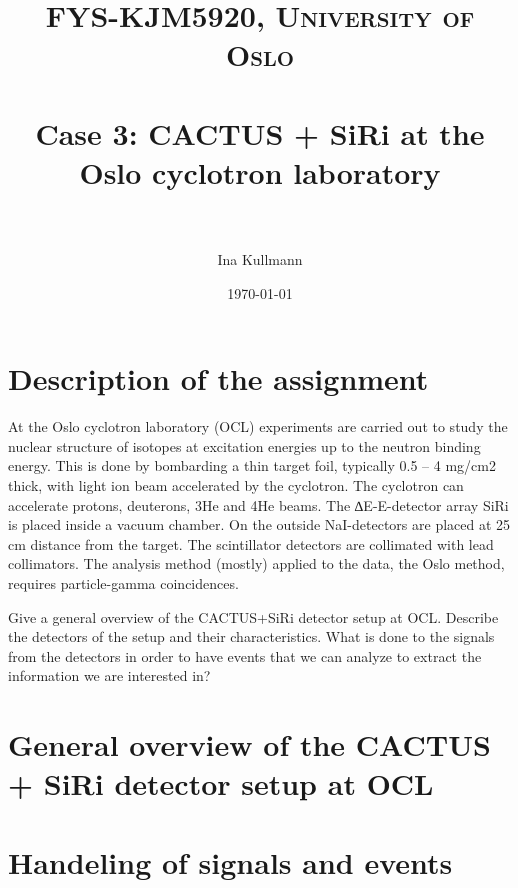 \documentclass[paper=a4, fontsize=11pt]{scrartcl} %
\title{	
\normalfont \normalsize 
\textsc{FYS-KJM5920, University of Oslo} \\ [25pt] %
\horrule{0.5pt} \\[0.4cm] %
\huge Case 3: CACTUS + SiRi at the Oslo cyclotron laboratory  \\ %
\horrule{2pt} \\[0.5cm] %
}
\author{Ina Kullmann} %
\date{\normalsize\today} %
\numberwithin{equation}{section} %
\numberwithin{figure}{section} %
\numberwithin{table}{section} %
\begin{document}
\maketitle %



\section*{Description of the assignment}

At the Oslo cyclotron laboratory (OCL) experiments are carried out to study the nuclear structure of isotopes at excitation energies up to the neutron binding energy. This is done by bombarding a thin target foil, typically 0.5 – 4 mg/cm2 thick, with light ion beam accelerated by the cyclotron. The cyclotron can accelerate protons, deuterons, 3He and 4He beams. The ∆E-E-detector array SiRi is placed inside a vacuum chamber. On the outside NaI-detectors are placed at 25 cm distance from the target. The scintillator detectors are collimated with lead collimators. The analysis method (mostly) applied to the data, the Oslo method, requires particle-gamma coincidences.

Give a general overview of the CACTUS+SiRi detector setup at OCL. Describe the detectors of the setup and their characteristics. What is done to the signals from the detectors in order to have events that we can analyze to extract the information we are interested in?



\section*{General overview of the CACTUS + SiRi detector setup at OCL}





\section*{Handeling of signals and events}
\end{document}
